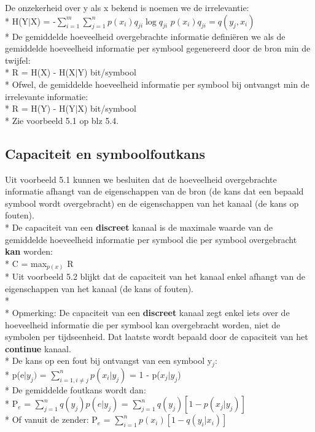 \documentclass[10pt]{article}
\begin{document}
De onzekerheid over y als x bekend is noemen we de irrelevantie:\\*
H(Y$|$X) = -$\sum_{i=1}^m\sum_{j=1}^n p(x_i)q_{ji}\log{q_{ji}}$ {\scriptsize $p(x_i)q_{ji} = q(y_j,x_i)$}\\*
De gemiddelde hoeveelheid overgebrachte informatie defini\"eren we als de gemiddelde hoeveelheid informatie per symbool gegenereerd door de bron min de twijfel:\\*
R = H(X) - H(X$|$Y) bit/symbool\\*
Ofwel, de gemiddelde hoeveelheid informatie per symbool bij ontvangst min de irrelevante informatie:\\*
R = H(Y) - H(Y$|$X) bit/symbool\\*
{\scriptsize Zie voorbeeld 5.1 op blz 5.4.}
\subsection{Capaciteit en symboolfoutkans}
Uit voorbeeld 5.1 kunnen we besluiten dat de hoeveelheid overgebrachte informatie afhangt van de eigenschappen van de bron (de kans dat een bepaald symbool wordt overgebracht) en de eigenschappen van het kanaal (de kans op fouten).\\*
De capaciteit van een {\bf discreet} kanaal is de maximale waarde van de gemiddelde hoeveelheid informatie per symbool die per symbool overgebracht {\bf kan} worden:\\*
C = max$_{p(x)}$ R\\*
Uit voorbeeld 5.2 blijkt dat de capaciteit van het kanaal enkel afhangt van de eigenschappen van het kanaal (de kans of fouten).\\*\\*
{\scriptsize Opmerking: De capaciteit van een {\bf discreet} kanaal zegt enkel iets over de hoeveelheid informatie die per symbool kan overgebracht worden, niet de symbolen per tijdseenheid. Dat laatste wordt bepaald door de capaciteit van het {\bf continue} kanaal.}\\*
De kans op een fout bij ontvangst van een symbool y$_j$:\\*
p(e$|y_j)$ = $\sum_{i=1, i\neq j}^n p(x_i|y_j)$ = 1 - p($x_j|y_j$)\\*
De gemiddelde foutkans wordt dan:\\*
P$_e$ = $\sum_{j = 1}^n q(y_j)p(e|y_j)$ = $\sum_{j=1}^n q(y_j)\left[1-p(x_j|y_j)\right]$\\*
Of vanuit de zender: P$_e$ = $\sum_{i=1}^np(x_i)\left[1-q(y_i|x_i)\right]$
\end{document}
